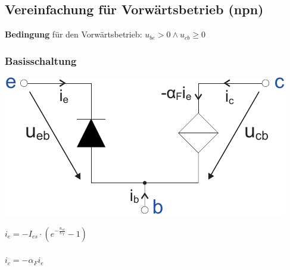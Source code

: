 \documentclass[a4paper,twocolumn,10pt]{article}
\begin{document}
\subsection*{Vereinfachung für Vorwärtsbetrieb (npn)}
\textbf{Bedingung} für den Vorwärtsbetrieb: $u_{be}>0 \wedge u_{cb}\geq 0$
\subsubsection*{Basisschaltung}
\begin{minipage}[b]{0.23\textwidth}
\includegraphics[width=\textwidth]{Grafiken/Basisschaltung_Vereinfachung}\\
\end{minipage}
\hfill
\begin{minipage}[b]{0.23\textwidth}
$i_e=-I_{es}\cdot (e^{-\frac{u_{eb}}{U_T}}-1)$\\\\
$i_c=-\alpha_Fi_e$\\\\
\end{minipage}
\end{document}
